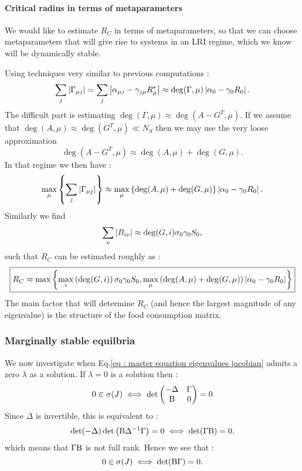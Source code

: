 \documentclass[12pt]{report}
\begin{document}
\paragraph{Critical radius in terms of metaparameters}
We would like to estimate $R_C$ in terms of metaparameters, so that we can choose metaparameters that will give rise to systems in an LRI regime, which we know will be dynamically stable.

Using techniques very similar to previous computations :
\begin{equation}
\sum_j \left|{\Gamma_{\mu j}}\right| = \sum_j \left|{\alpha_{\mu j}-\gamma_{j\mu}R^*_\mu}\right| \approx \deg(\Gamma, \mu)\left|{\alpha_0 - \gamma_0 R_0}\right|.
\end{equation}
The difficult part is estimating $\deg(\Gamma, \mu) \approx \deg(A-G^T, \mu)$. If we assume that $\deg(A, \mu)\approx \deg(G^T, \mu) \ll N_S$ then we may use the very loose approximation
\begin{equation}
\deg(A-G^T, \mu) \approx \deg(A, \mu)+\deg(G, \mu).
\end{equation}
In that regime we then have :
\begin{equation}
\max_\mu\left\{\sum_j \left|{\Gamma_{\mu j}}\right|\right\} \approx \max_\mu\left\{\deg(A, \mu)+\deg(G, \mu)\right\} \left|{\alpha_0-\gamma_0 R_0}\right|.
\end{equation}
Similarly we find
\begin{equation}
\sum_\nu \left|{B_{i\nu}}\right| \approx \deg(G, i) \sigma_0 \gamma_0 S_0,
\end{equation}
such that $R_C$ can be estimated roughly as :
\begin{equation}\boxed{
R_C \approx \max\left\{ \max_i\left(\deg(G,i)\right) \sigma_0 \gamma_0 S_0, \max_\mu\left(\deg(A,\mu)+\deg(G,\mu)\right)\left|{\alpha_0-\gamma_0 R_0}\right|\right\}
}\label{eq : estimate R_C metaparameters}
\end{equation}
The main factor that will determine $R_C$ (and hence the largest magnitude of any eigenvalue) is the structure of the food consumption matrix.

\subsubsection{Marginally stable equilbria}
We now investigate when Eq.\eqref{eq : master equation eigenvalues jacobian} admits a zero $\lambda$ as a solution. If $\lambda=0$ is a solution then :
\begin{equation}
0 \in \sigma(J) \iff
\det
\begin{pmatrix}
  -\Delta   & \Gamma \\
  \text{B} & 0
\end{pmatrix} = 0
\end{equation}
Since $\Delta$ is invertible, this is equivalent to :
\begin{equation}
\det(-\Delta) \det\left(\text{B}\Delta^{-1}\Gamma\right)=0 \iff \det(\Gamma\text{B})=0.
\end{equation}
which means that $\Gamma\text{B}$ is not full rank. Hence we see that :
\begin{equation}
0 \in \sigma(J) \iff \det(\text{B}\Gamma)=0.
\end{equation}
\end{document}

